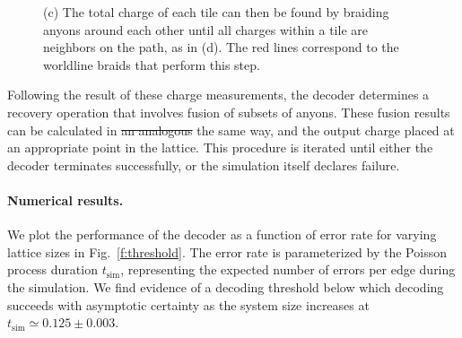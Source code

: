 \documentclass[aps, prl, letterpaper, twocolumn, superscriptaddress, notitlepage, 10pt]{revtex4}
\newcommand{\Fref}[1]{Fig.~\ref{#1}}
\begin{document}
\begin{figure}[t!]
\begin{center}
{%
(c) The total charge of each tile can then be found 
by braiding anyons around each other until all charges within 
a tile are neighbors on the path, as in (d).  
The red lines correspond to the worldline braids that perform this step.
}
\label{f:syndrome}
\end{center}
\vspace{-10pt}
\end{figure}

Following the result of these charge measurements, the decoder determines 
a recovery operation that involves fusion of subsets of anyons. 
These fusion results can be calculated in \sout{an analogous} the same way, 
and the output charge placed at an appropriate point in the lattice. 
This procedure is iterated until either the decoder terminates successfully, 
or the simulation itself declares failure.


\paragraph{Numerical results.}

We plot the performance of the decoder as a function of error rate for varying lattice sizes in 
\Fref{f:threshold}. 
The error rate is parameterized by the Poisson process duration $t_{\mathrm{sim}}$, representing the expected number of errors per edge during the simulation. 
We find evidence of a decoding threshold below which decoding succeeds with asymptotic 
certainty as the system size increases at $t_{\mathrm{sim}}\simeq 0.125 \pm 0.003$.
\end{document}
